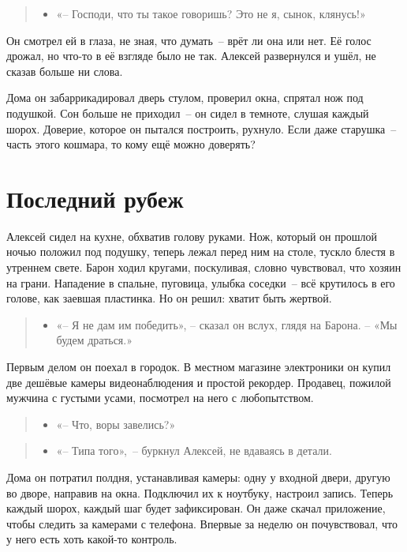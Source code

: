 \documentclass[12pt,a4paper]{book}
\newenvironment{dialogue}{\begin{quote}\itshape\begin{itemize}\item[]}{\end{itemize}\end{quote}}
\begin{document}
\begin{dialogue}
«-- Господи, что ты такое говоришь? Это не я, сынок, клянусь!»
\end{dialogue}

Он смотрел ей в глаза, не зная, что думать~-- врёт ли она или нет. Её голос дрожал, но что-то в её взгляде было не так. Алексей развернулся и ушёл, не сказав больше ни слова.

Дома он забаррикадировал дверь стулом, проверил окна, спрятал нож под подушкой. Сон больше не приходил~-- он сидел в темноте, слушая каждый шорох. Доверие, которое он пытался построить, рухнуло. Если даже старушка~-- часть этого кошмара, то кому ещё можно доверять?

\chapter{Последний рубеж}

Алексей сидел на кухне, обхватив голову руками. Нож, который он прошлой ночью положил под подушку, теперь лежал перед ним на столе, тускло блестя в утреннем свете. Барон ходил кругами, поскуливая, словно чувствовал, что хозяин на грани. Нападение в спальне, пуговица, улыбка соседки~-- всё крутилось в его голове, как заевшая пластинка. Но он решил: хватит быть жертвой.

\begin{dialogue}
    «-- Я не дам им победить», -- сказал он вслух, глядя на Барона. -- «Мы будем драться.»
\end{dialogue}

Первым делом он поехал в городок. В местном магазине электроники он купил две дешёвые камеры видеонаблюдения и простой рекордер. Продавец, пожилой мужчина с густыми усами, посмотрел на него с любопытством.

\begin{dialogue}
«-- Что, воры завелись?»
\end{dialogue}

\begin{dialogue}
«-- Типа того»,~-- буркнул Алексей, не вдаваясь в детали.
\end{dialogue}

Дома он потратил полдня, устанавливая камеры: одну у входной двери, другую во дворе, направив на окна. Подключил их к ноутбуку, настроил запись. Теперь каждый шорох, каждый шаг будет зафиксирован. Он даже скачал приложение, чтобы следить за камерами с телефона. Впервые за неделю он почувствовал, что у него есть хоть какой-то контроль.
\end{document}
